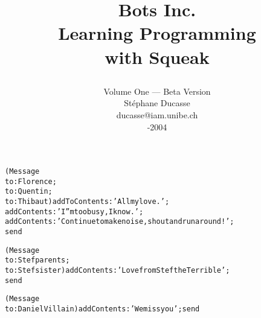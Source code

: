 

\newcommand{\underscore}{}

\let\wholebook=\relax

\title{
\vspace{0.5cm}
{\selectfont\fonttitre Bots Inc.}\\[0.5cm]
\hspace{1cm}\selectfont\fonttitrep Learning Programming \\[0.2cm] with Squeak\\ 
\author{\LARGE Volume One --- Beta Version\\ St\'ephane Ducasse\\ ducasse@iam.unibe.ch\\
-2004}}


\maketitle
\tableofcontents 


%


\chapter*{}

\begin{alltt} \textsf{
     (Message 
          to: Florence ; 
          to: Quentin ; 
          to: Thibaut) addToContents: 'All my love.' ; 
                       addContents: 'I''m too busy, I know.';
                       addContents: 'Continue to make noise, shout and run around!';
                       send}
\end{alltt}	

\begin{alltt}\textsf{
     (Message 
          to: Stef parents ; 
          to: Stef sister)  addContents: 'Love from Stef the Terrible' ; 
                            send}
\end{alltt}	

\begin{alltt}\textsf{
     (Message 
          to: Daniel Villain) addContents: 'We miss you' ; send}
\end{alltt}




